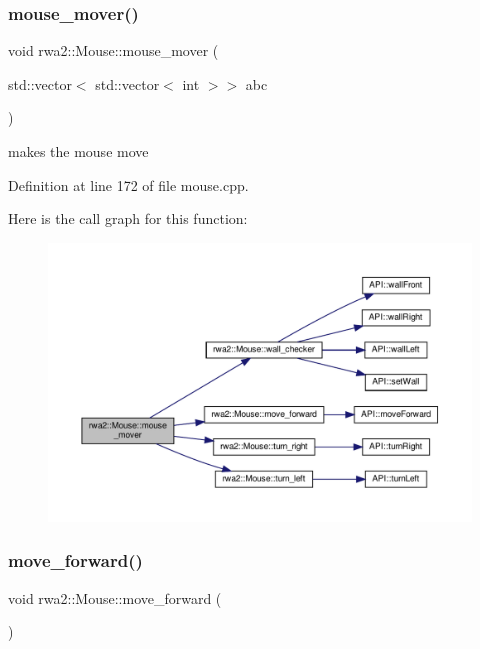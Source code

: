 \subsubsection{\texorpdfstring{mouse\+\_\+mover()}{mouse\_mover()}}
{\footnotesize\ttfamily void rwa2\+::\+Mouse\+::mouse\+\_\+mover (\begin{DoxyParamCaption}\item[{std\+::vector$<$ std\+::vector$<$ int $>$$>$}]{abc }\end{DoxyParamCaption})}



makes the mouse move 



Definition at line 172 of file mouse.\+cpp.

Here is the call graph for this function\+:
\nopagebreak
\begin{figure}[H]
\begin{center}
\leavevmode
\includegraphics[width=350pt]{classrwa2_1_1_mouse_a771abb2496a461ab78fa9d18fa8273ed_cgraph}
\end{center}
\end{figure}
\mbox{\label{classrwa2_1_1_mouse_afc6e0d56e3a777c05efa3929eb256e0a}} 
\subsubsection{\texorpdfstring{move\+\_\+forward()}{move\_forward()}}
{\footnotesize\ttfamily void rwa2\+::\+Mouse\+::move\+\_\+forward (\begin{DoxyParamCaption}{ }\end{DoxyParamCaption})}



